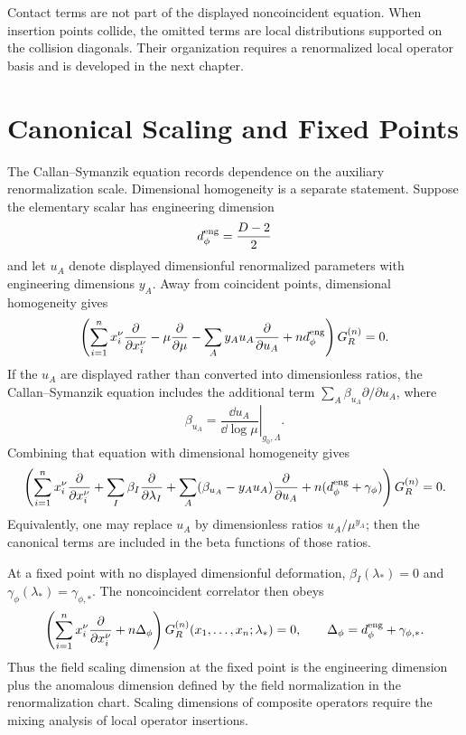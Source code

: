 Contact terms are not part of the displayed noncoincident equation.  When
insertion points collide, the omitted terms are local distributions supported
on the collision diagonals.  Their organization requires a renormalized local
operator basis and is developed in the next chapter.

\section{Canonical Scaling and Fixed Points}

The Callan--Symanzik equation records dependence on the auxiliary
renormalization scale.  Dimensional homogeneity is a separate statement.
Suppose the elementary scalar has engineering dimension
\[
  d_\phi^{\rm eng}=\frac{D-2}{2}
\]
and let \(u_A\) denote displayed dimensionful renormalized parameters with
engineering dimensions \(y_A\).  Away from coincident points, dimensional
homogeneity gives
\[
  \left(
    \sum_{i=1}^n x_i^\nu\frac{\partial}{\partial x_i^\nu}
    -
    \mu\frac{\partial}{\partial\mu}
    -
    \sum_A y_Au_A\frac{\partial}{\partial u_A}
    +
    n d_\phi^{\rm eng}
  \right)
  G_R^{(n)}
  =
  0 .
\]
If the \(u_A\) are displayed rather than converted into dimensionless ratios,
the Callan--Symanzik equation includes the additional term
\(\sum_A\beta_{u_A}\partial/\partial u_A\), where
\[
  \beta_{u_A}
  =
  \left.
  \frac{\dd u_A}{\dd\log\mu}
  \right|_{g_0,\Lambda}.
\]
Combining that equation with dimensional homogeneity gives
\[
  \left(
    \sum_{i=1}^n x_i^\nu\frac{\partial}{\partial x_i^\nu}
    +
    \sum_I\beta_I\frac{\partial}{\partial\lambda_I}
    +
    \sum_A(\beta_{u_A}-y_Au_A)\frac{\partial}{\partial u_A}
    +
    n(d_\phi^{\rm eng}+\gamma_\phi)
  \right)
  G_R^{(n)}
  =
  0 .
\]
Equivalently, one may replace \(u_A\) by dimensionless ratios
\(u_A/\mu^{y_A}\); then the canonical terms are included in the beta functions
of those ratios.

At a fixed point with no displayed dimensionful deformation,
\(\beta_I(\lambda_\ast)=0\) and
\(\gamma_\phi(\lambda_\ast)=\gamma_{\phi,\ast}\).  The noncoincident
correlator then obeys
\[
  \left(
    \sum_{i=1}^n x_i^\nu\frac{\partial}{\partial x_i^\nu}
    +
    n\Delta_\phi
  \right)
  G_R^{(n)}(x_1,\ldots,x_n;\lambda_\ast)
  =
  0,
  \qquad
  \Delta_\phi=d_\phi^{\rm eng}+\gamma_{\phi,\ast}.
\]
Thus the field scaling dimension at the fixed point is the engineering
dimension plus the anomalous dimension defined by the field normalization in
the renormalization chart.  Scaling dimensions of composite operators require
the mixing analysis of local operator insertions.

